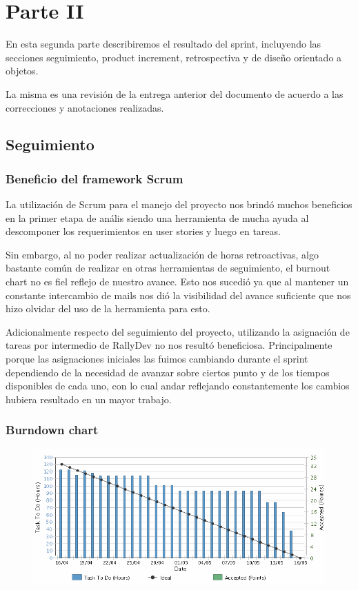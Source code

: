 \section{Parte II}

En esta segunda parte describiremos el resultado del sprint, incluyendo las secciones seguimiento, product increment, retrospectiva y de diseño orientado a objetos.
 
La misma es una revisi\'on de la entrega anterior del documento de acuerdo a las correcciones y anotaciones realizadas.


\subsection{Seguimiento}
\subsubsection{Beneficio del framework Scrum}

La utilizaci\'on de Scrum para el manejo del proyecto nos brindó muchos beneficios en la primer etapa de an\'alis siendo una herramienta de mucha ayuda al descomponer los requerimientos en user stories y luego en tareas. 

Sin embargo, al no poder realizar actualización de horas retroactivas, algo bastante común de realizar en otras herramientas de seguimiento, el burnout chart no es fiel reflejo de nuestro avance. Esto nos sucedió ya que al mantener un constante intercambio de mails nos di\'o la visibilidad del avance suficiente que nos hizo olvidar del uso de la herramienta para esto.

Adicionalmente respecto del seguimiento del proyecto, utilizando la asignaci\'on de tareas por intermedio de RallyDev no nos result\'o beneficiosa. Principalmente porque las asignaciones iniciales las fuimos cambiando durante el sprint dependiendo de la necesidad de avanzar sobre ciertos punto y de los tiempos disponibles de cada uno, con lo cual andar reflejando constantemente los cambios hubiera resultado en un mayor trabajo.

\subsubsection{Burndown chart}
\begin{figure}[ht]
\includegraphics[width=\textwidth]{./imgs/burndown.png}
\end{figure}

